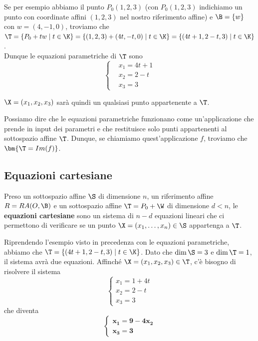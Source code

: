 \documentclass[11pt, a4paper, titlepage, oneside]{scrbook}
\begin{document}
Se per esempio abbiamo il punto $P_0(1,2,3)$ (con $P_0(1,2,3)$ indichiamo un punto con coordinate affini $(1,2,3)$ nel nostro riferimento affine) e $\B = \{w\}$ con $w = (4,-1,0)$, troviamo che $\T = \{P_0 + tw \mid t \in \K\} = \{(1,2,3) + (4t,-t,0) \mid t \in \K\} = \{(4t+1,2-t,3) \mid t \in \K\}$. \\
Dunque le equazioni parametriche di $\T$ sono
\[
\begin{cases}
&x_1 = 4t + 1 \\
&x_2 = 2 - t  \\
&x_3 = 3
\end{cases}
\]

$\X = (x_1, x_2, x_3)$ sarà quindi un qualsiasi punto appartenente a $\T$.

Possiamo dire che le equazioni parametriche funzionano come un'applicazione che prende in input dei parametri e che restituisce solo punti appartenenti al sottospazio affine $\T$. Dunque, se chiamiamo quest'applicazione $f$, troviamo che $\bm{\T = Im(f)}$.

\subsection{Equazioni cartesiane}

\begin{Definizione}
\label{def-equazioni-cartesiane}
Preso un sottospazio affine $\S$ di dimensione $n$, un riferimento affine $R = RA(O,\B)$ e un sottospazio affine $\T = P_0 + \W$ di dimensione $d < n$, le \textbf{equazioni cartesiane} sono un sistema di $n-d$ equazioni lineari che ci permettono di verificare se un punto $\X = (x_1, \ldots, x_n) \in \S$ appartenga a $\T$.
\end{Definizione}

Riprendendo l'esempio visto in precedenza con le equazioni parametriche, abbiamo che $\T = \{(4t + 1, 2-t, 3) \mid t \in \K\}$. Dato che $\dim \S = 3$ e $\dim \T = 1$, il sistema avrà due equazioni. Affinché $\X = (x_1, x_2, x_3) \in \T$, c'è bisogno di risolvere il sistema
\[
\begin{cases}
    x_1 = 1 + 4t \\
    x_2 = 2 - t \\
    x_3 = 3
\end{cases}
\]
che diventa
\[
\begin{cases}
 \bm{x_1 = 9 - 4x_2} \\
 \bm{x_3 = 3}
\end{cases}
\]
\end{document}
